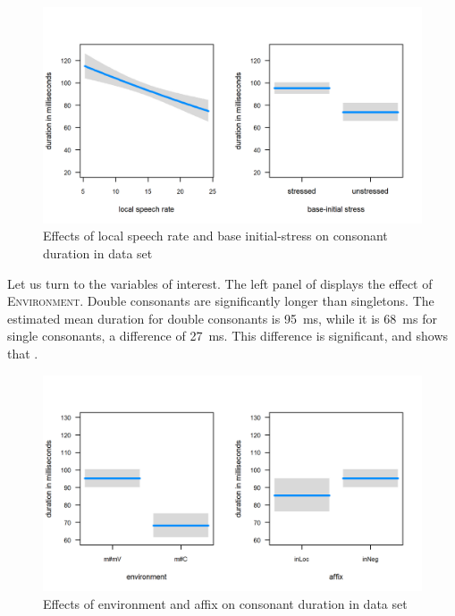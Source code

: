 \begin{figure}
	
	
	\includegraphics  [scale=0.8] {images/Corpus/inModelcov.png}
	\caption{Effects of local speech rate and base initial-stress on consonant duration in data set}
	\label{fig:covariates in}
\end{figure}

Let us turn to the variables of interest. The left panel of  displays the effect of \textsc{Environment}. Double consonants are significantly longer than singletons. The estimated mean duration for double consonants is 95~ms, while it is 68~ms for single consonants, a difference of 27~ms. This difference is significant, and shows that  . 







\begin{figure}
	
	\includegraphics [scale=0.8]  {images/Corpus/inModel.png}
	\caption{Effects of environment and affix on consonant duration in data set}
	\label{fig:inModel}
\end{figure}




